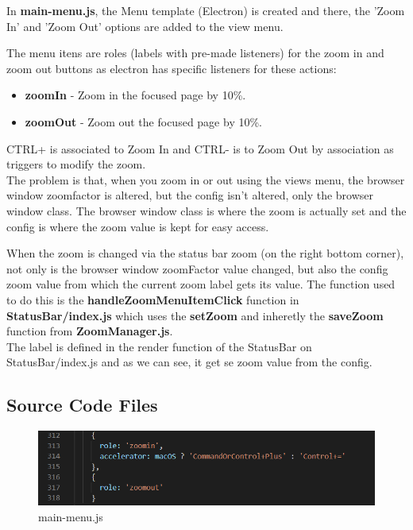 \documentclass[main.tex]{subfiles}
\begin{document}
In \textbf{main-menu.js}, the Menu template (Electron) is created and there, the 'Zoom In' and 'Zoom Out' options are added to the view menu.

The menu itens are roles (labels with pre-made listeners) for the zoom in and zoom out buttons as electron has specific listeners for these actions:

\begin{itemize}
\item \textbf{zoomIn} - Zoom in the focused page by 10\%.
\item \textbf{zoomOut} - Zoom out the focused page by 10\%. 
\end{itemize}

CTRL+ is associated to Zoom In and CTRL- is to Zoom Out by association as triggers to modify the zoom.\\

The problem is that, when you zoom in or out using the views menu, the browser window zoomfactor is altered, but the config isn't altered, only the browser window class. The browser window class is where the zoom is actually set and the config is where the zoom value is kept for easy access.

When the zoom is changed via the status bar zoom (on the right bottom corner), not only is the browser window zoomFactor value changed, but also the config zoom value from which the current zoom label gets its value. The function used to do this is the \textbf{handleZoomMenuItemClick} function in \textbf{StatusBar/index.js} which uses the \textbf{setZoom} and inheretly the \textbf{saveZoom} function from\textbf{ ZoomManager.js}.\\

The label is defined in the render function of the StatusBar on StatusBar/index.js and as we can see, it get se zoom value from the config.
\clearpage

\subsection{Source Code Files}

\begin{figure}[htbp]
\includegraphics[scale=0.5]{images/mainMenu.png}
\centering
\caption{main-menu.js}
\label{fig:filemain-menu}
\end{figure}
\end{document}
